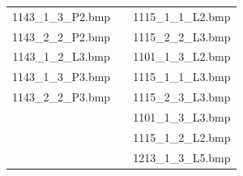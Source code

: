 \begin{table}[ht]
\begin{tabular}{ | c | c | c | }
      1143\_1\_3\_P2.bmp &                 & 1115\_1\_1\_L2.bmp     \\
      1143\_2\_2\_P2.bmp &                 & 1115\_2\_2\_L3.bmp     \\
      1143\_1\_2\_L3.bmp &                 & 1101\_1\_3\_L2.bmp     \\
      1143\_1\_3\_P3.bmp &                 & 1115\_1\_1\_L3.bmp     \\
      1143\_2\_2\_P3.bmp &                 & 1115\_2\_3\_L3.bmp     \\
                      &                 & 1101\_1\_3\_L3.bmp        \\
                      &                 & 1115\_1\_2\_L2.bmp        \\
                      &                 & 1213\_1\_3\_L5.bmp        \\
      \hline
    \end{tabular}
    \label{tab:subory_testov}
  \end{table}

